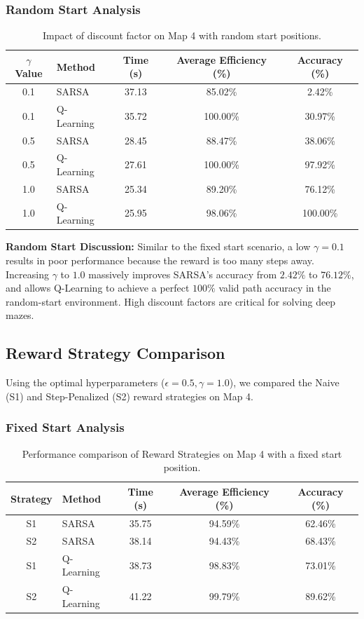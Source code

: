 \documentclass{article}
\begin{document}
\subsubsection{Random Start Analysis}
\begin{table}[H]
\centering
\begin{tabular}{clccc}
\toprule
\textbf{$\gamma$ Value} & \textbf{Method} & \textbf{Time (s)} & \textbf{Average Efficiency (\%)} & \textbf{Accuracy (\%)} \\ \midrule
0.1 & SARSA       & 37.13 & 85.02\% & 2.42\% \\
0.1 & Q-Learning  & 35.72 & 100.00\% & 30.97\% \\
0.5 & SARSA       & 28.45 & 88.47\% & 38.06\% \\
0.5 & Q-Learning  & 27.61 & 100.00\% & 97.92\% \\
1.0 & SARSA       & 25.34 & 89.20\% & 76.12\% \\
1.0 & Q-Learning  & 25.95 & 98.06\% & 100.00\% \\ \bottomrule
\end{tabular}
\caption{Impact of discount factor on Map 4 with random start positions.}
\end{table}

\textbf{Random Start Discussion:} Similar to the fixed start scenario, a low $\gamma=0.1$ results in poor performance because the reward is too many steps away. Increasing $\gamma$ to $1.0$ massively improves SARSA's accuracy from $2.42\%$ to $76.12\%$, and allows Q-Learning to achieve a perfect $100\%$ valid path accuracy in the random-start environment. High discount factors are critical for solving deep mazes.

\subsection{Reward Strategy Comparison}
Using the optimal hyperparameters ($\epsilon=0.5, \gamma=1.0$), we compared the Naive (S1) and Step-Penalized (S2) reward strategies on Map 4.

\subsubsection{Fixed Start Analysis}
\begin{table}[H]
\centering
\begin{tabular}{clccc}
\toprule
\textbf{Strategy} & \textbf{Method} & \textbf{Time (s)} & \textbf{Average Efficiency (\%)} & \textbf{Accuracy (\%)} \\ \midrule
S1 & SARSA       & 35.75 & 94.59\% & 62.46\% \\
S2 & SARSA       & 38.14 & 94.43\% & 68.43\% \\
S1 & Q-Learning  & 38.73 & 98.83\% & 73.01\% \\
S2 & Q-Learning  & 41.22 & 99.79\% & 89.62\% \\ \bottomrule
\end{tabular}
\caption{Performance comparison of Reward Strategies on Map 4 with a fixed start position.}
\end{table}
\end{document}
